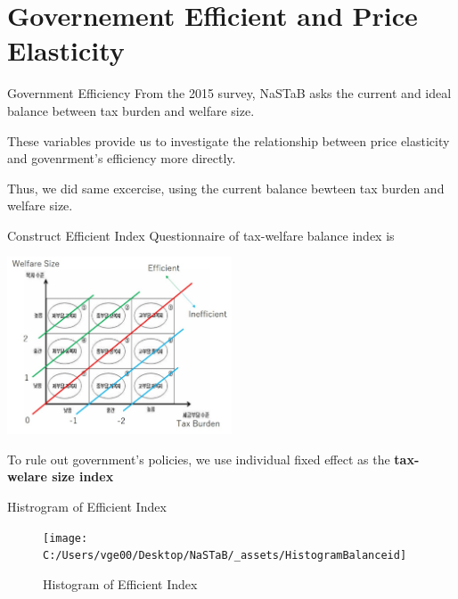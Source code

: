 \documentclass[
  ignorenonframetext,
]{beamer}
\begin{document}
\hypertarget{governement-efficient-and-price-elasticity}{%
\section{Governement Efficient and Price
Elasticity}\label{governement-efficient-and-price-elasticity}}

\begin{frame}{Government Efficiency}
\protect\hypertarget{government-efficiency}{}
From the 2015 survey, NaSTaB asks the current and ideal balance between
tax burden and welfare size.

These variables provide us to investigate the relationship between price
elasticity and govenrment's efficiency more directly.

Thus, we did same excercise, using the current balance bewteen tax
burden and welfare size.
\end{frame}

\begin{frame}{Construct Efficient Index}
\protect\hypertarget{construct-efficient-index}{}
Questionnaire of tax-welfare balance index is

\includegraphics[width=0.5\textwidth,height=\textheight]{_assets/BalanceQuestion.jpg}

To rule out government's policies, we use individual fixed effect as the
\textbf{tax-welare size index}
\end{frame}

\begin{frame}{Histrogram of Efficient Index}
\protect\hypertarget{histrogram-of-efficient-index}{}
\begin{figure}
\texttt{[image: C:/Users/vge00/Desktop/NaSTaB/\_assets/HistogramBalanceid]} \caption{Histogram of Efficient Index}\label{fig:unnamed-chunk-7}
\end{figure}
\end{frame}
\end{document}
